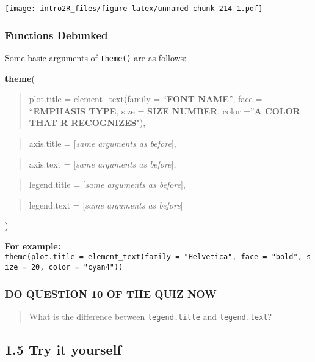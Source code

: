 \documentclass[
]{book}
\begin{document}
\texttt{[image: intro2R\_files/figure-latex/unnamed-chunk-214-1.pdf]}

\hypertarget{functions-debunked-21}{%
\subsubsection{Functions Debunked}\label{functions-debunked-21}}

Some basic arguments of \texttt{theme()} are as follows:

\textbf{\href{https://ggplot2.tidyverse.org/reference/theme.html}{theme}}(

\begin{quote}
plot.title = element\_text(family = ``\textbf{FONT NAME}'', face = ``\textbf{EMPHASIS TYPE}, size = \textbf{SIZE NUMBER}, color =''\textbf{A COLOR THAT R RECOGNIZES}"),
\end{quote}

\begin{quote}
axis.title = {[}\emph{same arguments as before}{]},
\end{quote}

\begin{quote}
axis.text = {[}\emph{same arguments as before}{]},
\end{quote}

\begin{quote}
legend.title = {[}\emph{same arguments as before}{]},
\end{quote}

\begin{quote}
legend.text = {[}\emph{same arguments as before}{]}
\end{quote}

)

\textbf{For example:} \texttt{theme(plot.title\ =\ element\_text(family\ =\ "Helvetica",\ face\ =\ "bold",\ size\ =\ 20,\ color\ =\ "cyan4"))}

\hypertarget{do-question-10-of-the-quiz-now-2}{%
\subsubsection{DO QUESTION 10 OF THE QUIZ NOW}\label{do-question-10-of-the-quiz-now-2}}

\begin{quote}
What is the difference between \texttt{legend.title} and \texttt{legend.text}?
\end{quote}

\hypertarget{try-it-yourself-27}{%
\subsection{1.5 Try it yourself}\label{try-it-yourself-27}}
\end{document}
